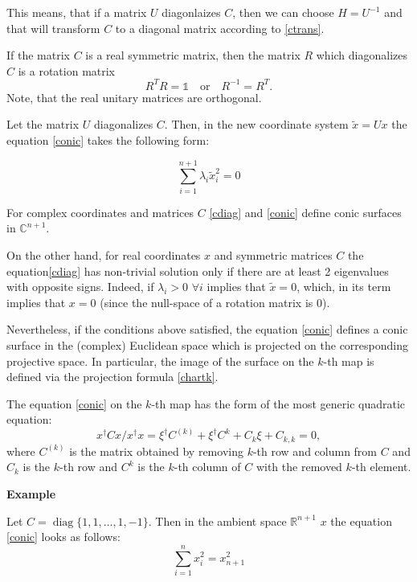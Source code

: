 \documentclass[a4paper,10pt]{article}
\newcommand{\diag}{\mathop{\mathrm{diag}}}
\begin{document}
This means, that if a matrix $U$ diagonlaizes $C$, then we can choose $H=U^{-1}$ and that will transform $C$ to a diagonal matrix according to \eqref{ctrans}. 

If the matrix $C$ is a real symmetric matrix, then the matrix $R$ which diagonalizes $C$ is a rotation matrix
\begin{equation}
 R^TR=\mathbb{1}\quad\text{or}\quad R^{-1} = R^{T}.
\end{equation}
Note, that the real unitary matrices are orthogonal.


Let the matrix $U$ diagonalizes $C$. Then, in the new coordinate system  $\tilde{x} = U x$ the equation \eqref{conic} takes the following form:

\begin{equation}
 \sum\limits_{i=1}^{n+1} \lambda_i \tilde{x}_i^2 = 0\label{cdiag}
\end{equation}

For complex coordinates and matrices $C$ \eqref{cdiag} and \eqref{conic} define conic surfaces in $\mathbb{C}^{n+1}$. 

On the other hand, for real coordinates $x$ and symmetric matrices $C$ the equation\eqref{cdiag} has non-trivial solution only if there are at least 2 eigenvalues with opposite signs. Indeed, if $\lambda_i >0$ $\forall i$ implies that $\tilde{x} = 0$, which, in its term implies that $x = 0$ (since the null-space of a rotation matrix is 0).

Nevertheless, if the conditions above satisfied, the equation \eqref{conic} defines a conic surface in the (complex) Euclidean space which is projected on the corresponding projective space. In particular, the image of the surface on the $k$-th map is defined via the projection formula \eqref{chartk}.

The equation \eqref{conic} on the $k$-th map has the form of the most generic quadratic equation:
\begin{equation}
 x^\dag C x / x^\dag x = \xi^\dag C^{(k)} + \xi^\dag C^k + C_k \xi + C_{k,k}= 0,
\end{equation}
where $C^{(k)}$ is the matrix obtained by removing $k$-th row and column from $C$ and $C_k$ is the $k$-th row and $C^k$ is the $k$-th column of $C$ with the removed $k$-th element. 

{\bf Example}

Let $C = \diag{\{1,1,\ldots,1,-1\}}$. Then in the ambient space $\mathbb{R}^{n+1}$ $x$ the equation \eqref{conic} looks as follows:
\begin{equation}
 \sum\limits_{i=1}^n x_i^2 = x_{n+1}^2
\end{equation}
\end{document}
